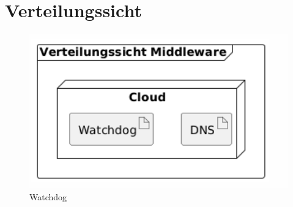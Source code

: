 \chapter{Verteilungssicht}

\begin{figure}[h!]
	\centering
	\includegraphics[width=0.8\linewidth]{diagrams/VSicht_Middleware.png}
	\caption{Watchdog}
	\label{fig:Middleware}
\end{figure}